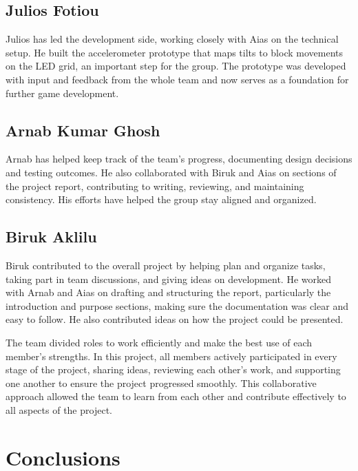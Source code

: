 \documentclass[11pt,titlepage,openright]{book}
\begin{document}
\section{Julios Fotiou}
Julios has led the development side, working closely with Aias on the technical setup. He built the accelerometer prototype that maps tilts to block movements on the LED grid, an important step for the group. The prototype was developed with input and feedback from the whole team and now serves as a foundation for further game development.

\section{Arnab Kumar Ghosh}
Arnab has helped keep track of the team’s progress, documenting design decisions and testing outcomes. He also collaborated with Biruk and Aias on sections of the project report, contributing to writing, reviewing, and maintaining consistency. His efforts have helped the group stay aligned and organized.


\section{Biruk Aklilu}
Biruk contributed to the overall project by helping plan and organize tasks, taking part in team discussions, and giving ideas on development. He worked with Arnab and Aias on drafting and structuring the report, particularly the introduction and purpose sections, making sure the documentation was clear and easy to follow. He also contributed ideas on how the project could be presented.

 \vspace{3ex}The team divided roles to work efficiently and make the best use of each member’s strengths. In this project, all members actively participated in every stage of the project, sharing ideas, reviewing each other’s work, and supporting one another to ensure the project progressed smoothly. This collaborative approach allowed the team to learn from each other and contribute effectively to all aspects of the project.


\chapter{Conclusions}




\end{document}

